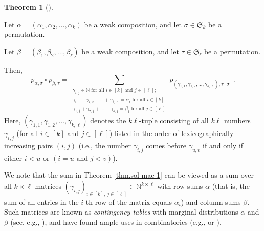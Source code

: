\documentclass[numbers=enddot,12pt,final,onecolumn,notitlepage]{scrartcl}%
\theoremstyle{definition}
\newtheorem{theo}{Theorem}[section]
\newenvironment{theorem}[1][]
{\begin{theo}[#1]\begin{leftbar}}
{\end{leftbar}\end{theo}}
\let\sumnonlimits\sum
\renewcommand{\sum}{\sumnonlimits\limits}
\begin{document}
\begin{theorem}
\label{thm.sol-mac-1}Let $\alpha=\left(  \alpha_{1},\alpha_{2},\ldots
,\alpha_{k}\right)  $ be a weak composition, and let $\sigma\in\mathfrak{S}%
_{k}$ be a permutation.

Let $\beta=\left(  \beta_{1},\beta_{2},\ldots,\beta_{\ell}\right)  $ be a weak
composition, and let $\tau\in\mathfrak{S}_{\ell}$ be a permutation.

Then,%
\[
p_{\alpha,\sigma}\circ p_{\beta,\tau}=\sum_{\substack{\gamma_{i,j}%
\in\mathbb{N}\text{ for all }i\in\left[  k\right]  \text{ and }j\in\left[
\ell\right]  ;\\\gamma_{i,1}+\gamma_{i,2}+\cdots+\gamma_{i,\ell}=\alpha
_{i}\text{ for all }i\in\left[  k\right]  ;\\\gamma_{1,j}+\gamma_{2,j}%
+\cdots+\gamma_{k,j}=\beta_{j}\text{ for all }j\in\left[  \ell\right]
}}p_{\left(  \gamma_{1,1},\gamma_{1,2},\ldots,\gamma_{k,\ell}\right)
,\tau\left[  \sigma\right]  }.
\]
Here, $\left(  \gamma_{1,1},\gamma_{1,2},\ldots,\gamma_{k,\ell}\right)  $
denotes the $k\ell$-tuple consisting of all $k\ell$ numbers $\gamma_{i,j}$
(for all $i\in\left[  k\right]  $ and $j\in\left[  \ell\right]  $) listed in
the order of lexicographically increasing pairs $\left(  i,j\right)  $ (i.e.,
the number $\gamma_{i,j}$ comes before $\gamma_{u,v}$ if and only if either
$i<u$ or $\left(  i=u\text{ and }j<v\right)  $).
\end{theorem}

We note that the sum in Theorem \ref{thm.sol-mac-1} can be viewed as a sum
over all $k\times\ell$-matrices $\left(  \gamma_{i,j}\right)  _{i\in\left[
k\right]  ,\ j\in\left[  \ell\right]  }\in\mathbb{N}^{k\times\ell}$ with row
sums $\alpha$ (that is, the sum of all entries in the $i$-th row of the matrix
equals $\alpha_{i}$) and column sums $\beta$. Such matrices are known as
\emph{contingency tables} with marginal distributions $\alpha$ and $\beta$
(see, e.g., \cite[\S 1]{LyuPak20}), and have found ample uses in combinatorics
(e.g., \cite[Corollary 1.3.11]{JamKer81} or \cite[Definition 4.3.4]{GriRei}).
\end{document}
